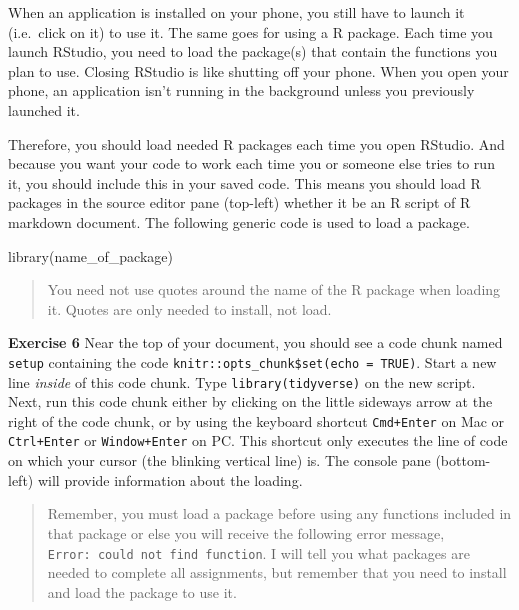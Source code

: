 \documentclass[
]{book}
\makeatletter
\newenvironment{Shaded}{\begin{snugshade}}{\end{snugshade}}
\newcommand{\FunctionTok}[1]{\textcolor[rgb]{0,0,0}{#1}}
\newcommand{\NormalTok}[1]{#1}
\newenvironment{kframe}{%
\medskip{}
\setlength{\fboxsep}{.8em}
 \def\at@end@of@kframe{}%
 \ifinner\ifhmode%
  \def\at@end@of@kframe{\end{minipage}}%
  \begin{minipage}{\columnwidth}%
 \fi\fi%
 \def\FrameCommand##1{\hskip\@totalleftmargin \hskip-\fboxsep
 \colorbox{shadecolor}{##1}\hskip-\fboxsep
     \hskip-\linewidth \hskip-\@totalleftmargin \hskip\columnwidth}%
 \MakeFramed {\advance\hsize-\width
   \@totalleftmargin\z@ \linewidth\hsize
   \@setminipage}}%
 {\par\unskip\endMakeFramed%
 \at@end@of@kframe}
\renewenvironment{Shaded}{\begin{kframe}}{\end{kframe}}
\newenvironment{rmdblock}[1]
  {\begin{shaded*}
  }
  {\end{shaded*}
  }
\newenvironment{learncheck}
  {\begin{rmdblock}{warning}}
  {\end{rmdblock}}
\makeatother
\begin{document}
When an application is installed on your phone, you still have to launch it (i.e.~click on it) to use it. The same goes for using a R package. Each time you launch RStudio, you need to load the package(s) that contain the functions you plan to use. Closing RStudio is like shutting off your phone. When you open your phone, an application isn't running in the background unless you previously launched it.

Therefore, you should load needed R packages each time you open RStudio. And because you want your code to work each time you or someone else tries to run it, you should include this in your saved code. This means you should load R packages in the source editor pane (top-left) whether it be an R script of R markdown document. The following generic code is used to load a package.

\begin{Shaded}
\begin{Highlighting}[]
\FunctionTok{library}\NormalTok{(name\_of\_package)}
\end{Highlighting}
\end{Shaded}

\begin{quote}
You need not use quotes around the name of the R package when loading it. Quotes are only needed to install, not load.
\end{quote}

\begin{learncheck}
\textbf{Exercise 6} Near the top of your document, you should see a code
chunk named \texttt{setup} containing the code
\texttt{knitr::opts\_chunk\$set(echo\ =\ TRUE)}. Start a new line
\emph{inside} of this code chunk. Type \texttt{library(tidyverse)} on
the new script. Next, run this code chunk either by clicking on the
little sideways arrow at the right of the code chunk, or by using the
keyboard shortcut \texttt{Cmd+Enter} on Mac or \texttt{Ctrl+Enter} or
\texttt{Window+Enter} on PC. This shortcut only executes the line of
code on which your cursor (the blinking vertical line) is. The console
pane (bottom-left) will provide information about the loading.
\end{learncheck}

\begin{quote}
Remember, you must load a package before using any functions included in that package or else you will receive the following error message, \texttt{Error:\ could\ not\ find\ function}. I will tell you what packages are needed to complete all assignments, but remember that you need to install and load the package to use it.
\end{quote}
\end{document}
